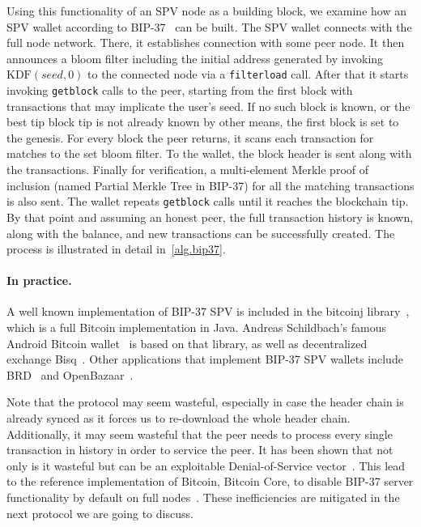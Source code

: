 Using this functionality of an SPV node as a building block, we examine how an SPV wallet according to BIP-37~\cite{bip37} can be built. The SPV wallet connects with the full node network. There, it establishes connection with some peer node. It then announces a bloom filter including the initial address generated by invoking $\text{KDF}(seed, 0)$ to the connected node via a \texttt{filterload} call. After that it starts invoking \texttt{getblock} calls to the peer, starting from the first block with transactions that may implicate the user's seed. If no such block is known, or the best tip block tip is not already known by other means, the first block is set to the genesis. For every block the peer returns, it scans each transaction for matches to the set bloom filter. To the wallet, the block header is sent along with the transactions. Finally for verification, a multi-element Merkle proof of inclusion (named Partial Merkle Tree in BIP-37) for all the matching transactions is also sent. The wallet repeats \texttt{getblock} calls until it reaches the blockchain tip. By that point and assuming an honest peer, the full transaction history is known, along with the balance, and new transactions can be successfully created. The process is illustrated in detail in~\cref{alg.bip37}.




\paragraph{In practice.} A well known implementation of BIP-37 SPV is included in the bitcoinj library~\cite{bitcoinj}, which is a full Bitcoin implementation in Java. Andreas Schildbach's famous Android Bitcoin wallet~\cite{schildbach} is based on that library, as well as decentralized exchange Bisq~\cite{bisq}. Other applications that implement BIP-37 SPV wallets include BRD~\cite{brd} and OpenBazaar~\cite{openbazaar}.

Note that the protocol may seem wasteful, especially in case the header chain is already synced as it forces us to re-download the whole header chain. Additionally, it may seem wasteful that the peer needs to process every single transaction in history in order to service the peer. It has been shown that not only is it wasteful but can be an exploitable Denial-of-Service vector~\cite{todd-bip37-attack}. This lead to the reference implementation of Bitcoin, Bitcoin Core, to disable BIP-37 server functionality by default on full nodes~\cite{bip37-disable}. These inefficiencies are mitigated in the next protocol we are going to discuss.

